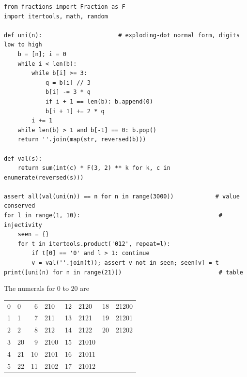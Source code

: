 \documentclass[11pt]{article}
\theoremstyle{definition}
\theoremstyle{plain}
\theoremstyle{remark}
\begin{document}
\begin{small}
\begin{verbatim}
from fractions import Fraction as F
import itertools, math, random

def uni(n):                      # exploding-dot normal form, digits low to high
    b = [n]; i = 0
    while i < len(b):
        while b[i] >= 3:
            q = b[i] // 3
            b[i] -= 3 * q
            if i + 1 == len(b): b.append(0)
            b[i + 1] += 2 * q
        i += 1
    while len(b) > 1 and b[-1] == 0: b.pop()
    return ''.join(map(str, reversed(b)))

def val(s):
    return sum(int(c) * F(3, 2) ** k for k, c in enumerate(reversed(s)))

assert all(val(uni(n)) == n for n in range(3000))            # value conserved
for l in range(1, 10):                                        # injectivity
    seen = {}
    for t in itertools.product('012', repeat=l):
        if t[0] == '0' and l > 1: continue
        v = val(''.join(t)); assert v not in seen; seen[v] = t
print([uni(n) for n in range(21)])                            # table
\end{verbatim}
\end{small}

The numerals for $0$ to $20$ are
\begin{center}
\small
\begin{tabular}{@{}rl@{\qquad}rl@{\qquad}rl@{\qquad}rl@{}}
\toprule
0 & 0 & 6 & 210 & 12 & 2120 & 18 & 21200\\
1 & 1 & 7 & 211 & 13 & 2121 & 19 & 21201\\
2 & 2 & 8 & 212 & 14 & 2122 & 20 & 21202\\
3 & 20 & 9 & 2100 & 15 & 21010 & &\\
4 & 21 & 10 & 2101 & 16 & 21011 & &\\
5 & 22 & 11 & 2102 & 17 & 21012 & &\\
\bottomrule
\end{tabular}
\end{center}
\end{document}
